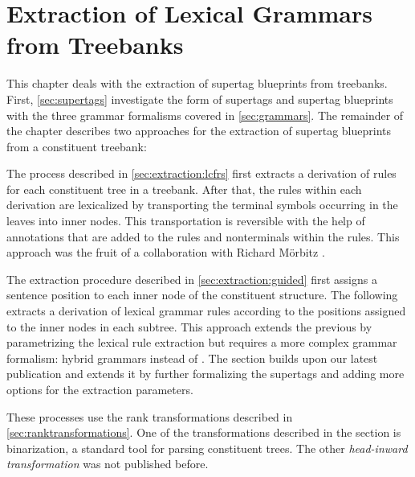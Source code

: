 \documentclass[../document.tex]{subfiles}
\begin{document}
    \chapter{Extraction of Lexical Grammars from Treebanks}\label{sec:extraction}
    This chapter deals with the extraction of supertag blueprints from treebanks.
    First, \cref{sec:supertags} investigate the form of supertags and supertag blueprints with the three grammar formalisms covered in \cref{sec:grammars}.
    The remainder of the chapter describes two approaches for the extraction of supertag blueprints from a constituent treebank:
    \begin{compactenum}
        \item
            The process described in \cref{sec:extraction:lcfrs} first extracts a derivation of  rules for each constituent tree in a treebank.
            After that, the rules within each derivation are lexicalized by transporting the terminal symbols occurring in the leaves into inner nodes.
            This transportation is reversible with the help of annotations that are added to the rules and nonterminals within the rules.
            This approach was the fruit of a collaboration with Richard Mörbitz \citep{MoeRup20,RupMoe21}.
        \item
            The extraction procedure described in \cref{sec:extraction:guided} first assigns a sentence position to each inner node of the constituent structure.
            The following extracts a derivation of lexical grammar rules according to the positions assigned to the inner nodes in each subtree.
            This approach extends the previous by parametrizing the lexical rule extraction but requires a more complex grammar formalism: hybrid grammars instead of .
            The section builds upon our latest publication \citep{Rup22} and extends it by further formalizing the supertags and adding more options for the extraction parameters.
    \end{compactenum}
    These processes use the rank transformations described in \cref{sec:ranktransformations}.
    One of the transformations described in the section is binarization, a standard tool for parsing constituent trees.
    The other \emph{head-inward transformation} was not published before.

    
    
    
    

\end{document}

